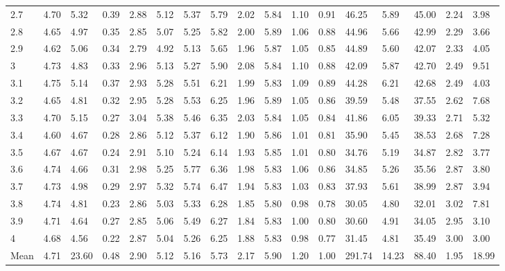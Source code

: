 \begin{adjustbox}{angle=90}
\begin{center}
\begin{tabular}{|l|llllllllllllllll|}
2.7&4.70&5.32&0.39&2.88&5.12&5.37&5.79&2.02&5.84&1.10&0.91&46.25&5.89&45.00&2.24&3.98  \\ 
2.8&4.65&4.97&0.35&2.85&5.07&5.25&5.82&2.00&5.89&1.06&0.88&44.96&5.66&42.99&2.29&3.66  \\ 
2.9&4.62&5.06&0.34&2.79&4.92&5.13&5.65&1.96&5.87&1.05&0.85&44.89&5.60&42.07&2.33&4.05  \\ 
3&4.73&4.83&0.33&2.96&5.13&5.27&5.90&2.08&5.84&1.10&0.88&42.09&5.87&42.70&2.49&9.51  \\ 
3.1&4.75&5.14&0.37&2.93&5.28&5.51&6.21&1.99&5.83&1.09&0.89&44.28&6.21&42.68&2.49&4.03  \\ 
3.2&4.65&4.81&0.32&2.95&5.28&5.53&6.25&1.96&5.89&1.05&0.86&39.59&5.48&37.55&2.62&7.68  \\ 
3.3&4.70&5.15&0.27&3.04&5.38&5.46&6.35&2.03&5.84&1.05&0.84&41.86&6.05&39.33&2.71&5.32  \\ 
3.4&4.60&4.67&0.28&2.86&5.12&5.37&6.12&1.90&5.86&1.01&0.81&35.90&5.45&38.53&2.68&7.28  \\ 
3.5&4.67&4.67&0.24&2.91&5.10&5.24&6.14&1.93&5.85&1.01&0.80&34.76&5.19&34.87&2.82&3.77  \\ 
3.6&4.74&4.66&0.31&2.98&5.25&5.77&6.36&1.98&5.83&1.06&0.86&34.85&5.26&35.56&2.87&3.80  \\ 
3.7&4.73&4.98&0.29&2.97&5.32&5.74&6.47&1.94&5.83&1.03&0.83&37.93&5.61&38.99&2.87&3.94  \\ 
3.8&4.74&4.81&0.23&2.86&5.03&5.33&6.28&1.85&5.80&0.98&0.78&30.05&4.80&32.01&3.02&7.81  \\ 
3.9&4.71&4.64&0.27&2.85&5.06&5.49&6.27&1.84&5.83&1.00&0.80&30.60&4.91&34.05&2.95&3.10  \\ 
4&4.68&4.56&0.22&2.87&5.04&5.26&6.25&1.88&5.83&0.98&0.77&31.45&4.81&35.49&3.00&3.00  \\ \hline \hline
Mean&4.71&23.60&0.48&2.90&5.12&5.16&5.73&2.17&5.90&1.20&1.00&291.74&14.23&88.40&1.95&18.99  \\ \hline
\end{tabular}
\end{center}
\end{adjustbox}





